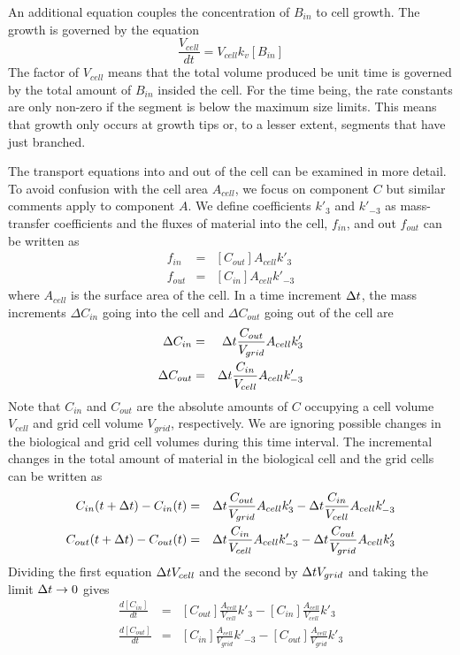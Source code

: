\documentclass[12pt]{article}
\begin{document}
An additional equation couples the concentration of $B_{in}$ to cell growth.
The growth is governed by the equation
\[
\frac{V_{cell}}{dt} = V_{cell}k_v[B_{in}]
\]
The factor of $V_{cell}$ means that the total volume produced be unit time is
governed by the total amount of $B_{in}$ insided the cell. For the time being,
the rate constants are only non-zero if the segment is below the maximum size
limits. This means that growth only occurs at growth tips or, to a lesser
extent, segments that have just branched.

The transport equations into and out of the cell can be examined in more detail.
To avoid confusion with the cell area $A_{cell}$, we focus on component $C$ but similar comments
apply to component $A$. We define coefficients $k'_3$ and $k'_{-3}$ as mass-transfer
coefficients and the fluxes of material into the cell, $f_{in}$, and out $f_{out}$ can be written
as
\begin{eqnarray*}
f_{in} &=& [C_{out}]A_{cell}k'_3 \\
f_{out} &=& [C_{in}]A_{cell}k'_{-3}
\end{eqnarray*}
where $A_{cell}$ is the surface area of the cell.
In a time increment $\Delta t$, the mass increments $\Delta C_{in}$ going into the cell and $\Delta
C_{out}$ going out of the cell are
\begin{eqnarray*}
\Delta C_{in} &=& \Delta t \frac{C_{out}}{V_{grid}}A_{cell}k'_3\\
\Delta C_{out} &=& \Delta t \frac{C_{in}}{V_{cell}}A_{cell}k'_{-3}
\end{eqnarray*}
Note that $C_{in}$ and $C_{out}$ are the absolute amounts of $C$ occupying a cell volume $V_{cell}$
and grid cell volume $V_{grid}$, respectively. We are ignoring possible changes in the biological
and grid cell volumes during this time interval. The incremental changes in the total amount of
material in the biological cell and the grid cells can be written as
\begin{eqnarray*}
C_{in}(t+\Delta t)-C_{in}(t) &=& \Delta t \frac{C_{out}}{V_{grid}}A_{cell}k'_3 - \Delta t\frac{C_{in}}{V_{cell}}
A_{cell}k'_{-3} \\
C_{out}(t+\Delta t)-C_{out}(t) &=& \Delta t \frac{C_{in}}{V_{cell}}A_{cell}k'_{-3} - \Delta t\frac{C_{out}}{V_{grid}}
A_{cell}k'_3
\end{eqnarray*}
Dividing the first equation $\Delta t V_{cell}$ and the second by $\Delta t V_{grid}$ and taking the limit $\Delta t
\rightarrow 0$ gives
\begin{eqnarray*}
\frac{d [C_{in}]}{dt} &=& [C_{out}]\frac{A_{cell}}{V_{cell}}k'_3 - [C_{in}]\frac{A_{cell}}{V_{cell}}
k'_3 \\
\frac{d[C_{out}]}{dt} &=& [C_{in}]\frac{A_{cell}}{V_{grid}}k'_{-3} - [C_{out}]\frac{A_{cell}}{V_{grid}}
k'_3
\end{eqnarray*}
\end{document}

